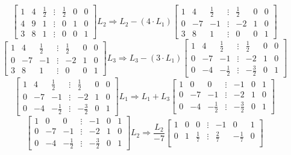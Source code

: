 \documentclass[12pt]{article}
\begin{document}
\begin{center}
$$\begin{bmatrix}
			1 & 4 & \frac{1}{2} & \vdots & \frac{1}{2} & 0 & 0 \\
			4 & 9 & 1 & \vdots & 0 & 1 & 0 \\
			3 & 8 & 1 & \vdots & 0 & 0 & 1
		\end{bmatrix} L_2 \Rightarrow L_2-(4\cdot L_1) \begin{bmatrix}
			1 & 4 & \frac{1}{2} & \vdots & \frac{1}{2} & 0 & 0 \\
			0 & -7 & -1 & \vdots & -2 & 1 & 0 \\
			3 & 8 & 1 & \vdots & 0 & 0 & 1
		\end{bmatrix}$$
		$$\begin{bmatrix}
			1 & 4 & \frac{1}{2} & \vdots & \frac{1}{2} & 0 & 0 \\
			0 & -7 & -1 & \vdots & -2 & 1 & 0 \\
			3 & 8 & 1 & \vdots & 0 & 0 & 1
		\end{bmatrix} L_3 \Rightarrow L_3-(3\cdot L_1) \begin{bmatrix}
			1 & 4 & \frac{1}{2} & \vdots & \frac{1}{2} & 0 & 0 \\
			0 & -7 & -1 & \vdots & -2 & 1 & 0 \\
			0 & -4 & -\frac{1}{2} & \vdots & -\frac{3}{2} & 0 & 1
		\end{bmatrix}$$	
		$$\begin{bmatrix}
			1 & 4 & \frac{1}{2} & \vdots & \frac{1}{2} & 0 & 0 \\
			0 & -7 & -1 & \vdots & -2 & 1 & 0 \\
			0 & -4 & -\frac{1}{2} & \vdots & -\frac{3}{2} & 0 & 1
		\end{bmatrix} L_1 \Rightarrow L_1+L_3 \begin{bmatrix}
			1 & 0 & 0 & \vdots & -1 & 0 & 1 \\
			0 & -7 & -1 & \vdots & -2 & 1 & 0 \\
			0 & -4 & -\frac{1}{2} & \vdots & -\frac{3}{2} & 0 & 1
		\end{bmatrix}$$		
		$$\begin{bmatrix}
			1 & 0 & 0 & \vdots & -1 & 0 & 1 \\
			0 & -7 & -1 & \vdots & -2 & 1 & 0 \\
			0 & -4 & -\frac{1}{2} & \vdots & -\frac{3}{2} & 0 & 1
		\end{bmatrix} L_2 \Rightarrow \frac{L_2}{-7} \begin{bmatrix}
			1 & 0 & 0 & \vdots & -1 & 0 & 1 \\
			0 & 1 & \frac{1}{7} & \vdots & \frac{2}{7} & -\frac{1}{7} & 0 \\

\end{bmatrix}$$
\end{center}
\end{document}
